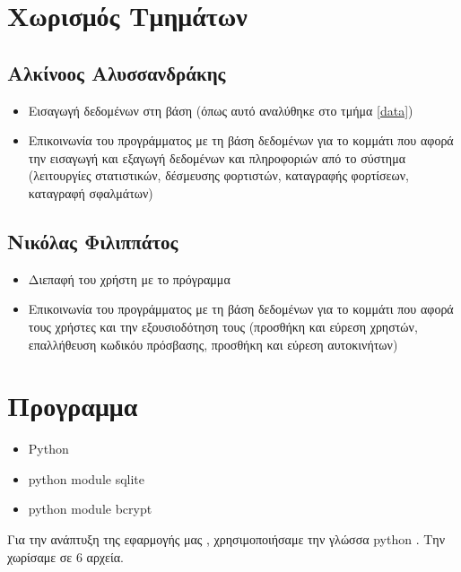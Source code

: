 \documentclass[manuscript,screen,review]{acmart}
\newcommand{\en}[1]{\foreignlanguage{english}{#1}}
\begin{document}
\section{Χωρισμός Τμημάτων}
\label{division}

\subsection{Αλκίνοος Αλυσσανδράκης}
\label{alkinoos}

\begin{itemize}
    \item Εισαγωγή δεδομένων στη βάση (όπως αυτό αναλύθηκε στο τμήμα \ref{data})
    \item Επικοινωνία του προγράμματος με τη βάση δεδομένων για το κομμάτι που αφορά την
        εισαγωγή και εξαγωγή δεδομένων και πληροφοριών από το σύστημα (λειτουργίες
        στατιστικών, δέσμευσης φορτιστών, καταγραφής φορτίσεων, καταγραφή σφαλμάτων)
\end{itemize}

\subsection{Νικόλας Φιλιππάτος}
\label{nikolas}

\begin{itemize}
    \item Διεπαφή του χρήστη με το πρόγραμμα
    \item Επικοινωνία του προγράμματος με τη βάση δεδομένων για το κομμάτι που αφορά τους
        χρήστες και την εξουσιοδότηση τους (προσθήκη και εύρεση χρηστών, επαλλήθευση
        κωδικόυ πρόσβασης, προσθήκη και εύρεση αυτοκινήτων)
\end{itemize}

\newpage 

\section{Προγραμμα}

\begin{itemize}
    \item \en{Python}
    \item \en{python module sqlite}
    \item \en{python module bcrypt} 
\end{itemize}

Για την ανάπτυξη της εφαρμογής μας , χρησιμοποιήσαμε την γλώσσα \en{python } . 
Την χωρίσαμε σε 6 αρχεία. 
\end{document}
